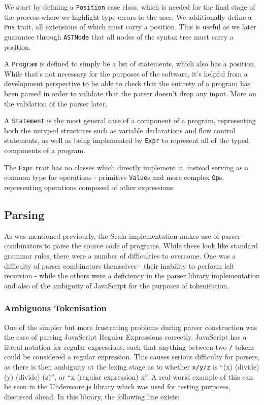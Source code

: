 \documentclass[british, twoside]{bhamthesis}
\theoremstyle{definition}
\begin{document}
      We start by defining a \texttt{Position} case class, which is needed for the final stage of the process where we highlight type errors to the user. We additionally define a \texttt{Pos} trait, all extensions of which must carry a position. This is useful as we later guarantee through \texttt{ASTNode} that all nodes of the syntax tree must carry a position.

      A \texttt{Program} is defined to simply be a list of statements, which also has a position. While that's not necessary for the purposes of the software, it's helpful from a development perspective to be able to check that the entirety of a program has been parsed in order to validate that the parser doesn't drop any input. More on the validation of the parser later.

      A \texttt{Statement} is the most general case of a component of a program, representing both the untyped structures such as variable declarations and flow control statements, as well as being implemented by \texttt{Expr} to represent all of the typed components of a program.

      The \texttt{Expr} trait has no classes which directly implement it, instead serving as a common type for operations - primitive \texttt{Value}s and more complex \texttt{Op}s, representing operations composed of other expressions.

    \subsection{Parsing}
      As was mentioned previously, the Scala implementation makes use of parser combinators to parse the source code of programs. While these look like standard grammar rules, there were a number of difficulties to overcome. One was a difficulty of parser combinators themselves - their inability to perform left recursion - while the others were a deficiency in the parser library implementation and also of the ambiguity of JavaScript for the purposes of tokenisation.

      \subsubsection{Ambiguous Tokenisation}
        One of the simpler but more frustrating problems during parser construction was the case of parsing JavaScript Regular Expressions correctly. JavaScript has a literal notation for regular expressions, such that anything between two \texttt{/} tokens could be considered a regular expression. This causes serious difficulty for parsers, as there is then ambiguity at the lexing stage as to whether \texttt{x/y/z} is ``(x) (divide) (y) (divide) (z)'', or ``x (regular expression) x''. A real-world example of this can be seen in the Underscore.js library which was used for testing purposes, discussed ahead. In this library, the following line exists:
\end{document}
